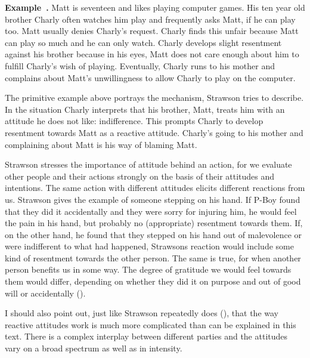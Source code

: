 \documentclass{article}
\newcounter{example}
\newenvironment{example}[1][]{\refstepcounter{example}\par\medskip
   \noindent \textbf{Example~\theexample. #1} \rmfamily}{\medskip}
\begin{document}


\begin{example}
	Matt is seventeen and likes playing computer games. His ten year old brother
	Charly often watches him play and frequently asks Matt, if he can play
	too. Matt usually denies Charly's request. Charly finds this unfair
	because Matt can play so much and he can only watch. Charly develops
	slight resentment against his brother because in his eyes, Matt
	does not care enough about him to fulfill Charly's wish of playing.
	Eventually, Charly runs to his mother and complains about Matt's
	unwillingness to allow Charly to play on the computer.
\end{example}

The primitive example above portrays the mechanism, Strawson tries to describe.
In the situation Charly interprets that his brother, Matt, treats him with an
attitude he does not like: indifference. This prompts Charly to develop
resentment towards Matt as a reactive attitude. Charly's going to his mother and
complaining about Matt is his way of blaming Matt.

Strawson stresses the importance of attitude behind an action, for we evaluate
other people and their actions strongly on the basis of their attitudes and
intentions. The same action with different attitudes elicits different reactions
from us. Strawson gives the example of someone stepping on his hand. If P-Boy
found that they did it accidentally and they were sorry for injuring him, he
would feel the pain in his hand, but probably no (appropriate) resentment
towards them. If, on the other hand, he found that they stepped on his hand out
of malevolence or were indifferent to what had happened, Strawsons reaction
would include some kind of resentment towards the other person. The same is
true, for when another person benefits us in some way. The degree of gratitude
we would feel towards them would differ, depending on whether they did it on
purpose and out of good will or accidentally (\cite[p.6]{Strawson1962}).



I should also point out, just like Strawson repeatedly does (\cite[p.5,
p.7]{Strawson1962}), that the way reactive attitudes work is much more
complicated than can be explained in this text. There is a complex
interplay between different parties and the attitudes vary on a broad spectrum
as well as in intensity.\\
\end{document}
